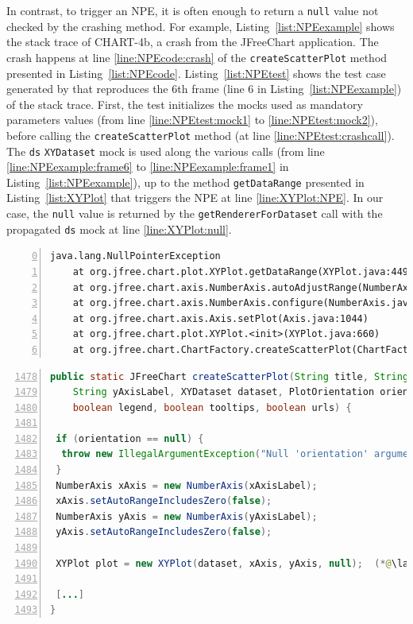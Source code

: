 In contrast, to trigger an NPE, it is often enough to return a \texttt{null} value not checked by the crashing method.
For example, Listing~\ref{list:NPEexample} shows the stack trace of CHART-4b, a crash from the JFreeChart application.
The crash happens at line \ref{line:NPEcode:crash} of the \texttt{createScatterPlot} method presented in Listing~\ref{list:NPEcode}. 
Listing~\ref{list:NPEtest} shows the test case generated by \evocrash that reproduces the 6th frame (line 6 in Listing~\ref{list:NPEexample}) of the stack trace. 
First, the test initializes the mocks used as mandatory parameters values (from line \ref{line:NPEtest:mock1} to \ref{line:NPEtest:mock2}), before calling the \texttt{createScatterPlot} method (at line \ref{line:NPEtest:crashcall}). The \texttt{ds} \texttt{XYDataset} mock is used along the various calls (from line \ref{line:NPEexample:frame6} to \ref{line:NPEexample:frame1} in Listing~\ref{list:NPEexample}), up to the method \texttt{getDataRange} presented in Listing~\ref{list:XYPlot} that triggers the NPE at line \ref{line:XYPlot:NPE}. In our case, the \texttt{null} value is returned by the \texttt{getRendererForDataset} call with the propagated \texttt{ds} mock at line \ref{line:XYPlot:null}.

\begin{lstlisting}[frame=tb,
  caption={Stack trace for the crash CHART-4b},
  label=list:NPEexample,
  captionpos=t,
  numbers=left,
  firstnumber=0]
java.lang.NullPointerException
	at org.jfree.chart.plot.XYPlot.getDataRange(XYPlot.java:4493)  (*@\label{line:NPEexample:frame1}@*)
	at org.jfree.chart.axis.NumberAxis.autoAdjustRange(NumberAxis.java:434)
	at org.jfree.chart.axis.NumberAxis.configure(NumberAxis.java:417)
	at org.jfree.chart.axis.Axis.setPlot(Axis.java:1044)
	at org.jfree.chart.plot.XYPlot.<init>(XYPlot.java:660)
	at org.jfree.chart.ChartFactory.createScatterPlot(ChartFactory.java:1490) (*@\label{line:NPEexample:frame6}@*)
\end{lstlisting}

\begin{lstlisting}[frame=tb,
  caption={Code excerpt from JFreeChart \texttt{ChartFactory.java}},
  label=list:NPEcode,
  captionpos=t,
  language=Java,
  numbers=left,
  firstnumber=1478]
public static JFreeChart createScatterPlot(String title, String xAxisLabel,
    String yAxisLabel, XYDataset dataset, PlotOrientation orientation,
    boolean legend, boolean tooltips, boolean urls) {

 if (orientation == null) {
  throw new IllegalArgumentException("Null 'orientation' argument.");
 }
 NumberAxis xAxis = new NumberAxis(xAxisLabel);
 xAxis.setAutoRangeIncludesZero(false);
 NumberAxis yAxis = new NumberAxis(yAxisLabel);
 yAxis.setAutoRangeIncludesZero(false);

 XYPlot plot = new XYPlot(dataset, xAxis, yAxis, null);  (*@\label{line:NPEcode:crash}@*)

 [...]
}
\end{lstlisting}

